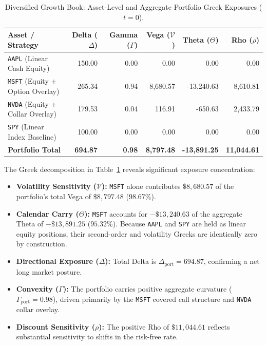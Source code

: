 \documentclass{article}
\theoremstyle{plain}
\theoremstyle{definition}
\theoremstyle{remark}
\begin{document}
\begin{table}[htbp]
\centering
\small
\caption{Diversified Growth Book: Asset-Level and Aggregate Portfolio Greek Exposures ($t=0$).}
\label{tab:baseline_greeks}
\begin{tabularx}{\textwidth}{l r r r r r}
\toprule
\textbf{Asset / Strategy} & \textbf{Delta ($\Delta$)} & \textbf{Gamma ($\Gamma$)} & \textbf{Vega ($\mathcal{V}$)} & \textbf{Theta ($\Theta$)} & \textbf{Rho ($\rho$)} \\
\midrule
\texttt{AAPL} (Linear Cash Equity) & 150.00 & 0.00 & 0.00 & 0.00 & 0.00 \\
\texttt{MSFT} (Equity + Option Overlay) & 265.34 & 0.94 & 8,680.57 & -13,240.63 & 8,610.81 \\
\texttt{NVDA} (Equity + Collar Overlay) & 179.53 & 0.04 & 116.91 & -650.63 & 2,433.79 \\
\texttt{SPY} (Linear Index Baseline) & 100.00 & 0.00 & 0.00 & 0.00 & 0.00 \\
\midrule
\textbf{Portfolio Total} & \textbf{694.87} & \textbf{0.98} & \textbf{8,797.48} & \textbf{-13,891.25} & \textbf{11,044.61} \\
\bottomrule
\end{tabularx}
\end{table}

The Greek decomposition in Table~\ref{tab:baseline_greeks} reveals significant exposure concentration:
\begin{itemize}
    \item \textbf{Volatility Sensitivity ($\mathcal{V}$):} \texttt{MSFT} alone contributes $\$8,680.57$ of the portfolio's total Vega of $\$8,797.48$ ($98.67\%$). 
    \item \textbf{Calendar Carry ($\Theta$):} \texttt{MSFT} accounts for $-\$13,240.63$ of the aggregate Theta of $-\$13,891.25$ ($95.32\%$). Because \texttt{AAPL} and \texttt{SPY} are held as linear equity positions, their second-order and volatility Greeks are identically zero by construction.
    \item \textbf{Directional Exposure ($\Delta$):} Total Delta is $\Delta_{\text{port}} = 694.87$, confirming a net long market posture.
    \item \textbf{Convexity ($\Gamma$):} The portfolio carries positive aggregate curvature ($\Gamma_{\text{port}} = 0.98$), driven primarily by the \texttt{MSFT} covered call structure and \texttt{NVDA} collar overlay.
    \item \textbf{Discount Sensitivity ($\rho$):} The positive Rho of $\$11,044.61$ reflects substantial sensitivity to shifts in the risk-free rate.
\end{itemize}
\end{document}
